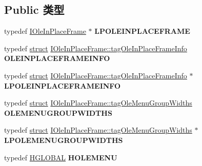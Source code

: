 \subsection*{Public 类型}
\begin{DoxyCompactItemize}
\item 
\mbox{\label{interface_i_ole_in_place_frame_ad179dcedfcc865adfb4d5ff3a9635bd6}} 
typedef \hyperlink{interface_i_ole_in_place_frame}{I\+Ole\+In\+Place\+Frame} $\ast$ {\bfseries L\+P\+O\+L\+E\+I\+N\+P\+L\+A\+C\+E\+F\+R\+A\+ME}
\item 
\mbox{\label{interface_i_ole_in_place_frame_a292c4e2261f725b45d6a033d152a35e6}} 
typedef \hyperlink{interfacestruct}{struct} \hyperlink{struct_i_ole_in_place_frame_1_1tag_ole_in_place_frame_info}{I\+Ole\+In\+Place\+Frame\+::tag\+Ole\+In\+Place\+Frame\+Info} {\bfseries O\+L\+E\+I\+N\+P\+L\+A\+C\+E\+F\+R\+A\+M\+E\+I\+N\+FO}
\item 
\mbox{\label{interface_i_ole_in_place_frame_af16ff11a2cdd198705df8f6e37695ee8}} 
typedef \hyperlink{interfacestruct}{struct} \hyperlink{struct_i_ole_in_place_frame_1_1tag_ole_in_place_frame_info}{I\+Ole\+In\+Place\+Frame\+::tag\+Ole\+In\+Place\+Frame\+Info} $\ast$ {\bfseries L\+P\+O\+L\+E\+I\+N\+P\+L\+A\+C\+E\+F\+R\+A\+M\+E\+I\+N\+FO}
\item 
\mbox{\label{interface_i_ole_in_place_frame_ac76f66d5d70209bd5a76aa8476cb3a66}} 
typedef \hyperlink{interfacestruct}{struct} \hyperlink{struct_i_ole_in_place_frame_1_1tag_ole_menu_group_widths}{I\+Ole\+In\+Place\+Frame\+::tag\+Ole\+Menu\+Group\+Widths} {\bfseries O\+L\+E\+M\+E\+N\+U\+G\+R\+O\+U\+P\+W\+I\+D\+T\+HS}
\item 
\mbox{\label{interface_i_ole_in_place_frame_ac629adfe858f45fc355c70a9476f79dd}} 
typedef \hyperlink{interfacestruct}{struct} \hyperlink{struct_i_ole_in_place_frame_1_1tag_ole_menu_group_widths}{I\+Ole\+In\+Place\+Frame\+::tag\+Ole\+Menu\+Group\+Widths} $\ast$ {\bfseries L\+P\+O\+L\+E\+M\+E\+N\+U\+G\+R\+O\+U\+P\+W\+I\+D\+T\+HS}
\item 
\mbox{\label{interface_i_ole_in_place_frame_a26d70fb3e7908bd2ac257175e58820f6}} 
typedef \hyperlink{interfacevoid}{H\+G\+L\+O\+B\+AL} {\bfseries H\+O\+L\+E\+M\+E\+NU}
\end{DoxyCompactItemize}
